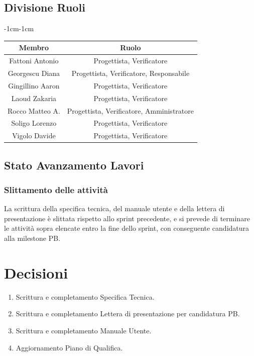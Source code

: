 \documentclass[a4paper,12pt]{article}
\begin{document}
\subsection{Divisione Ruoli}
\begin{table}[H]
    \begin{adjustwidth}{-1cm}{-1cm}
    \centering
\begin{tabular}{|c|c|}
    \hline
    \textbf{Membro} & \textbf{Ruolo} \\
    \hline
    Fattoni Antonio & Progettista, Verificatore\\
    \hline
    Georgescu Diana & Progettista, Verificatore, Responsabile\\
    \hline
    Gingillino Aaron & Progettista, Verificatore\\
    \hline
    Laoud Zakaria & Progettista, Verificatore\\
    \hline
    Rocco Matteo A. & Progettista, Verificatore, Amministratore\\
    \hline
    Soligo Lorenzo & Progettista, Verificatore \\
    \hline
    Vigolo Davide & Progettista, Verificatore \\
    \hline
\end{tabular}
    \end{adjustwidth}
\end{table}

\subsection{Stato Avanzamento Lavori}

\subsubsection{Slittamento delle attività}
La scrittura della specifica tecnica, del manuale utente e della lettera di presentazione è slittata rispetto allo sprint precedente, e si prevede di terminare le attività sopra elencate entro la fine dello sprint, con conseguente candidatura alla milestone PB.



\section{Decisioni}
\begin{enumerate}
    \item Scrittura e completamento Specifica Tecnica.
    \item Scrittura e completamento Lettera di presentazione per candidatura PB.
    \item Scrittura e completamento Manuale Utente.
    \item Aggiornamento Piano di Qualifica.
\end{enumerate}
\end{document}
